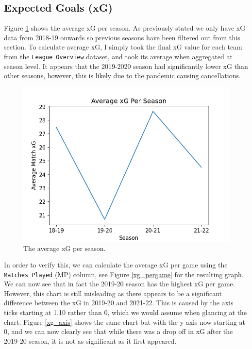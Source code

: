 \documentclass[12pt, a4paper, twocolumn]{article}
\begin{document}
\subsection{Expected Goals (xG)}

Figure \ref{xg} shows the average xG per season. As previously stated we only have xG data from 2018-19 onwards so previous seasons have been filtered out from this section. To calculate average xG, I simply took the final xG value for each team from the \verb|League Overview| dataset, and took its average when aggregated at season level. It appears that the 2019-2020 season had significantly lower xG than other seasons, however, this is likely due to the pandemic causing cancellations.

\begin{figure}
  \includegraphics[width=\linewidth]{../vis/tables/average_xg.png}
  \caption{The average xG per season.}
  \label{xg}
\end{figure}

In order to verify this, we can calculate the average xG per game using the \verb|Matches Played| (MP) column, see Figure \ref{xg_pergame} for the resulting graph. We can now see that in fact the 2019-20 season has the highest xG per game. However, this chart is still misleading as there appears to be a significant difference between the xG in 2019-20 and 2021-22. This is caused by the axis ticks starting at 1.10 rather than 0, which we would assume when glancing at the chart. Figure \ref{xg_axis} shows the same chart but with the y-axis now starting at 0, and we can now clearly see that while there was a drop off in xG after the 2019-20 season, it is not as significant as it first appeared.
\end{document}
